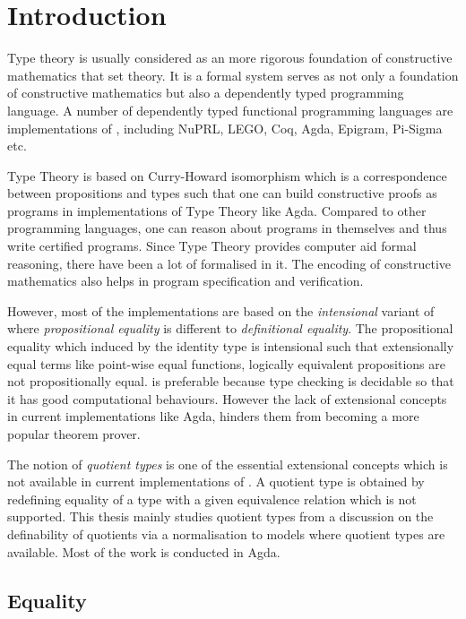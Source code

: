 \chapter{Introduction}

Type theory is usually considered as an more rigorous foundation of
constructive mathematics that set theory.
 It is a formal system serves as not only a foundation of constructive mathematics but also a dependently typed programming language. A number of
dependently typed functional programming languages are implementations of \mltt, including NuPRL, LEGO, Coq, Agda, Epigram, Pi-Sigma etc.


Type Theory is based on Curry-Howard isomorphism which is a correspondence between propositions and types such that one can build constructive proofs as programs in  implementations of Type Theory like Agda. Compared to other programming languages, one can reason about programs in themselves and thus write certified programs.
Since Type Theory provides computer aid formal reasoning, there have been a lot of \maths formalised in it. The encoding of constructive mathematics also helps in program specification and verification. 

However, most of the implementations are based on the \emph{intensional} variant of \mltt where \emph{propositional equality} is different to \emph{definitional equality}. The propositional equality which induced by the identity type is intensional such that extensionally equal terms like point-wise equal functions, logically equivalent propositions are not propositionally equal. \itt is preferable because type checking is decidable so that it has good computational behaviours. However the lack of extensional concepts in current implementations like Agda, hinders them from becoming a more popular theorem prover.

The notion of \emph{quotient types} is one of the essential extensional concepts which is not available in current implementations of \itt. A quotient type is obtained by redefining equality of a type with a given equivalence relation which is not supported. This thesis mainly studies quotient types from a discussion on the definability of quotients via a normalisation to models where quotient types are available. Most of the work is conducted in Agda.


\section{Equality}

